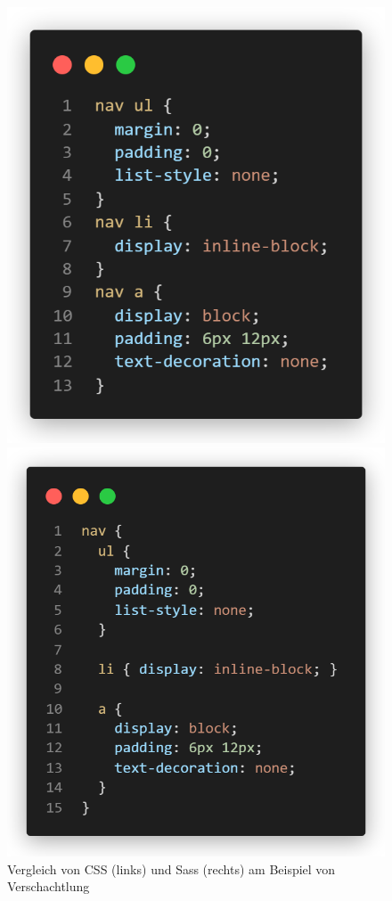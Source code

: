 \begin{figure}[!htb]
  \begin{minipage}{0.48\textwidth}
    \centering
    \includegraphics[width=.95\linewidth]{images/css-example.png}
  \end{minipage}\hfill
  \begin{minipage}{0.48\textwidth}
    \centering
    \includegraphics[width=1\linewidth]{images/sass-example.png}
  \end{minipage}
  \caption[Vergleich von CSS und Sass]{Vergleich von CSS (links) und Sass (rechts) am Beispiel von Verschachtlung \cite{SassGuide}}
  \label{fig:store-definition}
\end{figure}

